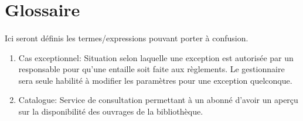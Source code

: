 \section*{Glossaire}
\paragraph{} Ici seront définis les termes/expressions pouvant porter à confusion.\par
 \begin{enumerate}
     \item Cas exceptionnel: Situation selon laquelle une exception est autorisée 
     par un responsable pour qu’une entaille soit faite aux règlements. 
     Le gestionnaire sera seule habilité à modifier les paramètres pour une 
     exception quelconque.
     \item Catalogue: Service de consultation permettant à un abonné d’avoir 
     un aperçu sur la disponibilité des ouvrages de la bibliothèque.
    
 \end{enumerate}
  